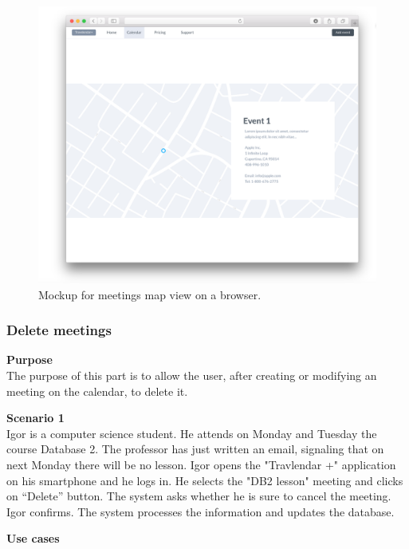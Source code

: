 \documentclass{article}
\begin{document}
	\begin{figure}[h!]
		\bigskip
		\centering
		\includegraphics[scale=0.25]{img/mockups/web/map.png}
		\caption{Mockup for meetings map view on a browser.}
	\end{figure}


	\newpage
	\subsubsection{Delete meetings}
	
	\bigskip
	\noindent
	\textbf{Purpose} \\
	The purpose of this part is to allow the user, after creating or modifying an meeting on the calendar, to delete it.
	
	\bigskip
	\noindent
	\textbf{Scenario 1} \\
	Igor is a computer science student. He attends on Monday and Tuesday the course  Database 2. The professor has just written an email, signaling that on next Monday there will be no lesson. Igor opens the "Travlendar +" application on his smartphone and he logs in. He selects the "DB2 lesson" meeting and clicks on “Delete” button. The system asks whether he is sure to cancel the meeting. Igor confirms. The system processes the information and updates the database.
	
	\bigskip
	\noindent
	\textbf{Use cases} \\
	
\end{document}
